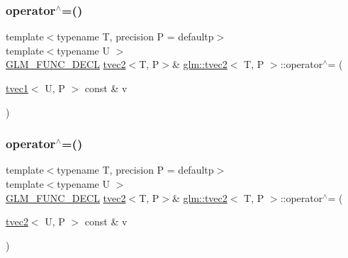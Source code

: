 \subsubsection{\texorpdfstring{operator$^\wedge$=()}{operator^=()}\hspace{0.1cm}{\footnotesize\ttfamily [2/6]}}
{\footnotesize\ttfamily template$<$typename T, precision P = defaultp$>$ \\
template$<$typename U $>$ \\
\mbox{\hyperlink{setup_8hpp_ab2d052de21a70539923e9bcbf6e83a51}{G\+L\+M\+\_\+\+F\+U\+N\+C\+\_\+\+D\+E\+CL}} \mbox{\hyperlink{structglm_1_1tvec2}{tvec2}}$<$T, P$>$\& \mbox{\hyperlink{structglm_1_1tvec2}{glm\+::tvec2}}$<$ T, P $>$\+::operator$^\wedge$= (\begin{DoxyParamCaption}\item[{\mbox{\hyperlink{structglm_1_1tvec1}{tvec1}}$<$ U, P $>$ const \&}]{v }\end{DoxyParamCaption})}

\mbox{\label{structglm_1_1tvec2_ac1398d1c0dbada005b4ed27a9a568c28}} 
\subsubsection{\texorpdfstring{operator$^\wedge$=()}{operator^=()}\hspace{0.1cm}{\footnotesize\ttfamily [3/6]}}
{\footnotesize\ttfamily template$<$typename T, precision P = defaultp$>$ \\
template$<$typename U $>$ \\
\mbox{\hyperlink{setup_8hpp_ab2d052de21a70539923e9bcbf6e83a51}{G\+L\+M\+\_\+\+F\+U\+N\+C\+\_\+\+D\+E\+CL}} \mbox{\hyperlink{structglm_1_1tvec2}{tvec2}}$<$T, P$>$\& \mbox{\hyperlink{structglm_1_1tvec2}{glm\+::tvec2}}$<$ T, P $>$\+::operator$^\wedge$= (\begin{DoxyParamCaption}\item[{\mbox{\hyperlink{structglm_1_1tvec2}{tvec2}}$<$ U, P $>$ const \&}]{v }\end{DoxyParamCaption})}

\mbox{\label{structglm_1_1tvec2_a5026bdfe8ccedecefd92963b117b33d3}} 
